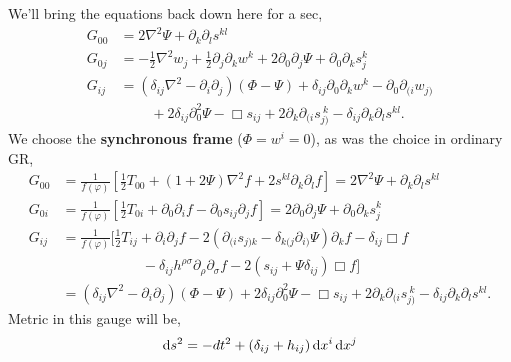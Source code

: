 We'll bring the equations back down here for a sec, 
\begin{equation}
\begin{split}
    G_{00} &= 2\nabla^2\Psi + \partial_k\partial_ls^{kl}\\
    G_{0j} &= -\frac{1}{2}\nabla^2w_j + \frac{1}{2}\partial_j\partial_kw^k + 2\partial_0\partial_j\Psi +\partial_0\partial_ks_j^k \\
    G_{ij} &= (\delta_{ij}\nabla^2 - \partial_i\partial_j)(\Phi - \Psi) + \delta_{ij}\partial_0\partial_kw^k - \partial_0\partial_{(i}w_{j)}\\
    &\ \ \ \ \ \ \ \ \ \ + 2\delta_{ij}\partial_0^2\Psi - \Box s_{ij} + 2\partial_k\partial_{(i}s_{j)}^{\ k} -\delta_{ij}\partial_k\partial_ls^{kl}.
\end{split}
\end{equation}
We choose the \textbf{synchronous frame} ($\Phi=w^i=0$), as was the choice in ordinary GR, 
\begin{equation}
\begin{split}
    G_{00} &= \frac{1}{f(\varphi)}\left[\frac{1}{2}T_{00} + (1 +2\Psi)\nabla^2f + 2s^{kl}\partial_k\partial_lf\right]= 2\nabla^2\Psi + \partial_k\partial_ls^{kl}\\
    G_{0i}&= \frac{1}{f(\varphi)}\left[\frac{1}{2}T_{0i} + \partial_0\partial_if - \partial_0s_{ij}\partial_jf\right]= 2\partial_0\partial_j\Psi +\partial_0\partial_ks_j^k\\
    G_{ij} &=\frac{1}{f(\varphi)}\Biggr[\frac{1}{2}T_{ij} + \partial_i\partial_jf - 2\left(\partial_{(i}s_{j)k} - \delta_{k(j}\partial_{i)}\Psi\right)\partial_kf-\delta_{ij}\Box f \\
    &\ \ \ \ \ \ \ \ \ \ \ \ \ \ \ \ \ \ \ \ \ \ \ \ \ \ -\delta_{ij}h^{\rho\sigma}\partial_{\rho}\partial_{\sigma}f - 2\left(s_{ij} + \Psi\delta_{ij}\right)\Box f\Biggr]\\
    &= (\delta_{ij}\nabla^2 - \partial_i\partial_j)(\Phi - \Psi) + 2\delta_{ij}\partial_0^2\Psi - \Box s_{ij} + 2\partial_k\partial_{(i}s_{j)}^{\ k} -\delta_{ij}\partial_k\partial_ls^{kl}.
\end{split}
\end{equation}
Metric in this gauge will be, 
\begin{equation}
    \operatorname{d}\!{s}^2= -dt^2 + (\delta_{ij} + h_{ij})\operatorname{d}\!{x}^i\operatorname{d}\!{x}^j
\end{equation}





